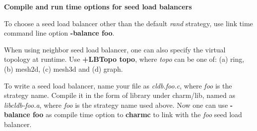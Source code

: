 %
%
%
%
%
%
%
%
{\bf Compile and run time options for seed load balancers}

To choose a seed load balancer other than the default {\em rand} strategy,
use link time command line option {\bf -balance foo}. 

When using {\rm neighbor} seed load balancer, one can also specify
the virtual topology at runtime. Use {\bf +LBTopo topo}, where {\em topo}
can be one of: (a) ring, (b) mesh2d, (c) mesh3d and (d) graph.

To write a seed load balancer, name your file as {\em cldb.foo.c},
where {\em foo} is the strategy name.  Compile it in the form of library
under charm/lib, named as {\em libcldb-foo.a}, where {\em foo} is the strategy 
name used above. Now one can use {\bf -balance foo} as compile time option
to {\bf charmc} to link with the {\em foo} seed load balancer.

